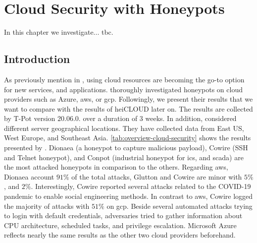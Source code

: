 \chapter{Cloud Security with Honeypots}

In this chapter we investigate... tbc.

\section{Introduction}

As previously mention in , using cloud resources are becoming the go-to option for new services, and applications.
\citet{Kelly2021} thoroughly investigated honeypots on cloud providers such as Azure, \ac{aws}, or \ac{gcp}.
Followingly, we present their results that we want to compare with the results of heiCLOUD later on.
The results are collected by T-Pot version $20.06.0.$ over a duration of 3 weeks.
In addition, \citet{Kelly2021} considered different server geographical locations.
They have collected data from East US, West Europe, and Southeast Asia.
\autoref{tab:overview-cloud-security} shows the results presented by \citet{Kelly2021}.
Dionaea (a honeypot to capture malicious payload), Cowire (SSH and Telnet honeypot), and Conpot (industrial honeypot for \ac{ics}, and \ac{scada}) are the most attacked honeypots in comparison to the others.
Regarding \ac{aws}, Dionaea account $91\%$ of the total attacks, Glutton and Cowire are minor with $5\%$, and $2\%$.
Interestingly, Cowire reported several attacks related to the COVID-19 pandemic to enable social engineering methods.
In contrast to \ac{aws}, Cowire logged the majority of attacks with $51\%$ on \ac{gcp}.
Beside several automated attacks trying to login with default credentials, adversaries tried to gather information about CPU architecture, scheduled tasks, and privilege escalation.
Microsoft Azure reflects nearly the same results as the other two cloud providers beforehand.

